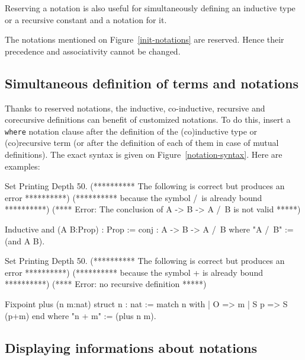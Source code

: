 Reserving a notation is also useful for simultaneously defining an
inductive type or a recursive constant and a notation for it.

\Rem The notations mentioned on Figure~\ref{init-notations} are
reserved. Hence their precedence and associativity cannot be changed.

\subsection{Simultaneous definition of terms and notations
}

Thanks to reserved notations, the inductive, co-inductive, recursive
and corecursive definitions can benefit of customized notations. To do
this, insert a {\tt where} notation clause after the definition of the
(co)inductive type or (co)recursive term (or after the definition of
each of them in case of mutual definitions). The exact syntax is given
on Figure~\ref{notation-syntax}. Here are examples:

\begin{coq_eval}
Set Printing Depth 50.
(********** The following is correct but produces an error **********)
(********** because the symbol /\ is already bound **********)
(**** Error: The conclusion of A -> B -> A /\ B is not valid *****)
\end{coq_eval}

\begin{coq_example*}
Inductive and (A B:Prop) : Prop := conj : A -> B -> A /\ B 
where "A /\ B" := (and A B).
\end{coq_example*}

\begin{coq_eval}
Set Printing Depth 50.
(********** The following is correct but produces an error **********)
(********** because the symbol + is already bound **********)
(**** Error: no recursive definition *****)
\end{coq_eval}

\begin{coq_example*}
Fixpoint plus (n m:nat) {struct n} : nat :=
  match n with
  | O => m
  | S p => S (p+m)
  end
where "n + m" := (plus n m).
\end{coq_example*}

\subsection{Displaying informations about notations
}

